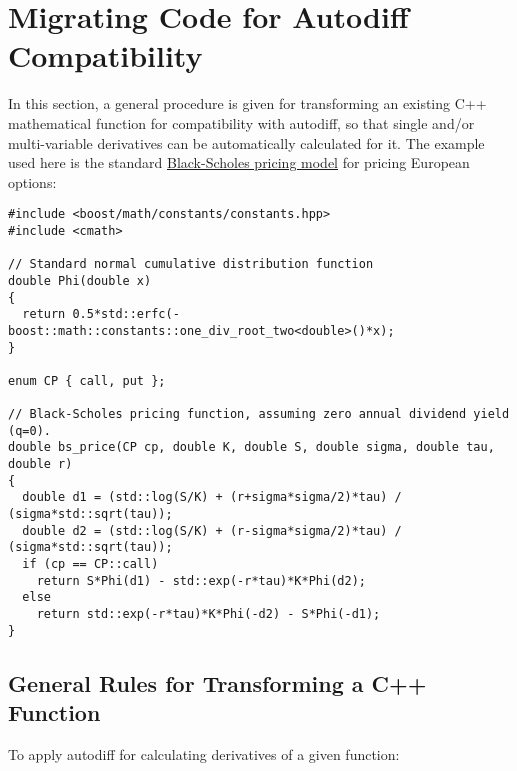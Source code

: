 \documentclass{article}
\begin{document}
\section{Migrating Code for Autodiff Compatibility}\label{migrate}

In this section, a general procedure is given for transforming an existing C++
mathematical function for compatibility with autodiff, so that single and/or multi-variable
derivatives can be automatically calculated for it. The example used here is the standard
\href{https://en.wikipedia.org/wiki/Greeks_(finance)#Formulas_for_European_option_Greeks}{Black-Scholes pricing
model} for pricing European options:

\begingroup
\fontsize{10pt}{10pt}\selectfont
\begin{verbatim}
#include <boost/math/constants/constants.hpp>
#include <cmath>

// Standard normal cumulative distribution function
double Phi(double x)
{
  return 0.5*std::erfc(-boost::math::constants::one_div_root_two<double>()*x);
}

enum CP { call, put };

// Black-Scholes pricing function, assuming zero annual dividend yield (q=0).
double bs_price(CP cp, double K, double S, double sigma, double tau, double r)
{
  double d1 = (std::log(S/K) + (r+sigma*sigma/2)*tau) / (sigma*std::sqrt(tau));
  double d2 = (std::log(S/K) + (r-sigma*sigma/2)*tau) / (sigma*std::sqrt(tau));
  if (cp == CP::call)
    return S*Phi(d1) - std::exp(-r*tau)*K*Phi(d2);
  else
    return std::exp(-r*tau)*K*Phi(-d2) - S*Phi(-d1);
}
\end{verbatim}
\endgroup

\subsection{General Rules for Transforming a C++ Function}
To apply autodiff for calculating derivatives of a given function:
\end{document}
